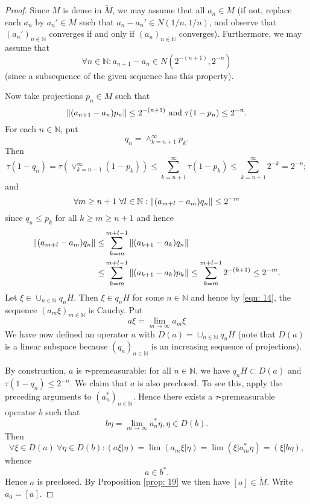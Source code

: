 \begin{proof}
    Since $M$ is dense in $\widetilde{M}$, we may assume that all $a_n\in M$ (if not, replace each $a_n$ by $a_n'\in M$ such that $a_n-a_n'\in N(1/n, 1/n)$, and observe that $(a_n')_{n\in \mathbb{N}}$ converges if and only if $(a_n)_{n\in \mathbb{N}}$ converges). Furthermore, we may assume that
    \[
        \forall n\in \mathbb{N}: a_{n+1}-a_n\in N(2^{-(n+1)},2^{-n})
    \]
    (since a subsequence of the given sequence has this property).\par
    Now take projections $p_n \in M$ such that
    \[
        \norm{(a_{n+1}-a_n)p_n}\leq 2^{-(n+1)} \text{ and } \tau(1-p_n)\leq 2^{-n}.
    \]
    For each $n\in \mathbb{N}$, put
    \[
        q_n=\wedge_{k=n+1}^\infty p_k.
    \]
    Then
    \[
        \tau(1-q_n)=\tau\left( \vee_{k=n-1}^\infty (1-p_k) \right)\leq \sum_{k=n+1}^\infty \tau(1-p_k)\leq \sum_{k=n+1}^\infty 2^{-k}=2^{-n};
    \]
    and
    \begin{equation}\label{eqn: 14}
        \forall m\geq n+1~\forall l\in \mathbb{N}:\norm{(a_{m+l}-a_m)q_n}\leq 2^{-m}
    \end{equation}
    since $q_n\leq p_k$ for all $k\geq m\geq n+1$ and hence
    \[
        \begin{split}
            \norm{(a_{m+l}-a_m)q_n}\leq& \sum_{k=m}^{m+l-1}\norm{(a_{k+1}-a_k)q_n}\\
            \leq& \sum_{k=m}^{m+l-1}\norm{(a_{k+1}-a_k)p_k}\leq \sum_{k=m}^{m+l-1}2^{-(k+1)}\leq 2^{-m}.
        \end{split}
    \]
    Let $\xi\in \cup_{n\in \mathbb{N}}q_nH$. Then $\xi\in q_nH$ for some $n\in \mathbb{N}$ and hence by \eqref{eqn: 14}, the sequence $(a_m\xi)_{m\in \mathbb{N}}$ is Cauchy. Put
    \[
        a\xi=\lim_{m\to \infty}a_m\xi
    \]
    We have now defined an operator $a$ with $D(a)=\cup_{n\in \mathbb{N}}q_nH$ (note that $D(a)$ is a linear subspace because $(q_n)_{n\in \mathbb{N}}$ is an increasing sequence of projections).\par
    By construction, $a$ is $\tau$-premeasurable: for all $n\in \mathbb{N}$, we have $q_nH\subset D(a)$ and $\tau(1-q_n)\leq 2^{-n}$. We claim that $a$ is also preclosed. To see this, apply the preceding arguments to $(a_n^*)_{n\in \mathbb{N}}$. Hence there exists a $\tau$-premeasurable operator $b$ such that
    \[
        b\eta=\lim_{m\to \infty}a_n^*\eta,\eta\in D(b).
    \]
    Then
    \[
        \forall \xi\in D(a)~\forall \eta\in D(b):(a\xi|\eta)=\lim (a_m\xi|\eta)=\lim(\xi|a_m^*\eta)=(\xi|b\eta),
    \]
    whence
    \[
        a\in b^*.
    \]
    Hence $a$ is preclosed. By Proposition \ref{prop: 19} we then have $[a]\in \widetilde{M}$. Write $a_0=[a]$.\par

\end{proof}
